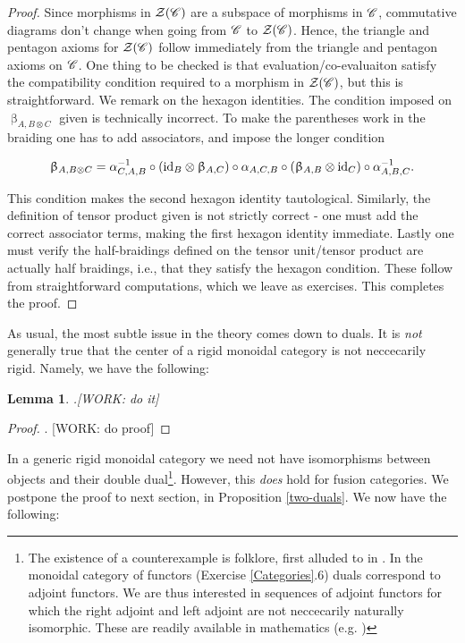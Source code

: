 \documentclass{article}
\newtheorem{lemma}{Lemma}[section]
\theoremstyle{definition}
\numberwithin{figure}{section}
\begin{document}
\begin{proof} Since morphisms in $\mathcal{Z}(\mathscr{C})$ are a subspace of morphisms in $\mathscr{C}$, commutative diagrams don't change when going from $\mathscr{C}$ to $\mathcal{Z}(\mathscr{C})$. Hence, the triangle and pentagon axioms for $\mathcal{Z}(\mathscr{C})$ follow immediately from the triangle and pentagon axioms on $\mathscr{C}$. One thing to be checked is that evaluation/co-evaluaiton satisfy the compatibility condition required to a morphism in $\mathcal{Z}(\mathscr{C})$, but this is straightforward. We remark on the hexagon identities. The condition imposed on $\upbeta_{A,B\otimes C}$ given is technically incorrect. To make the parentheses work in the braiding one has to add associators, and impose the longer condition

$$\upbeta_{A,B\otimes C}=\alpha_{C,A,B}^{-1}\circ \left(\mathrm{id}_{B}\otimes \upbeta_{A,C}\right)\circ \alpha_{A,C,B}\circ\left(\upbeta_{A,B}\otimes \mathrm{id}_C\right)\circ \alpha^{-1}_{A,B,C}.$$

This condition makes the second hexagon identity tautological. Similarly, the definition of tensor product given is not strictly correct - one must add the correct associator terms, making the first hexagon identity immediate. Lastly one must verify the half-braidings defined on the tensor unit/tensor product are actually half braidings, i.e., that they satisfy the hexagon condition. These follow from straightforward computations, which we leave as exercises. This completes the proof.

\end{proof}

As usual, the most subtle issue in the theory comes down to duals. It is \textit{not} generally true that the center of a rigid monoidal category is not neccecarily rigid. Namely, we have the following:

\begin{lemma}.[WORK: do it]
\end{lemma}
\begin{proof}. [WORK: do proof]
\end{proof}

In a generic rigid monoidal category we need not have isomorphisms between objects and their double dual\footnote{The existence of a counterexample is folklore, first alluded to in \cite[Page 9]{muger2008tensor}. In the monoidal category of functors (Exercise \ref{Categories}.6) duals correspond to adjoint functors. We are thus interested in sequences of adjoint functors for which the right adjoint and left adjoint are not neccecarily naturally isomorphic. These are readily available in mathematics (e.g. \cite[Remark 6.11]{rahn2021generalized})}. However, this \textit{does} hold  for fusion categories. We postpone the proof to next section, in Proposition \ref{two-duals}. We now have the following:
\end{document}
